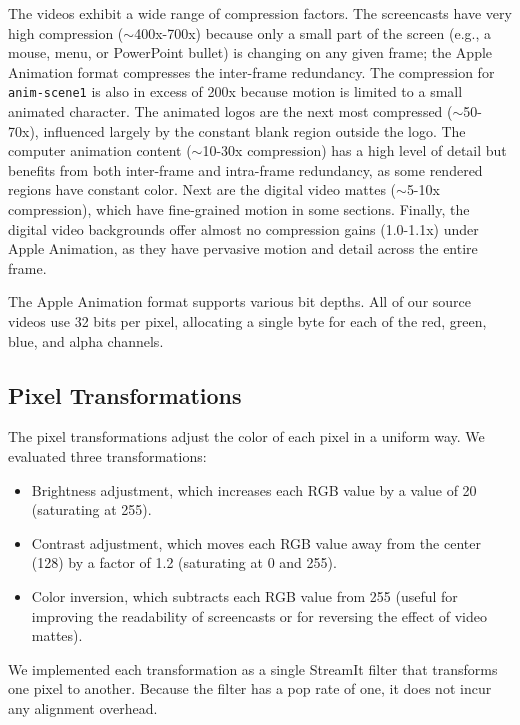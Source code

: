 The videos exhibit a wide range of compression factors.  The
screencasts have very high compression ($\sim$400x-700x) because only
a small part of the screen (e.g., a mouse, menu, or PowerPoint bullet)
is changing on any given frame; the Apple Animation format compresses
the inter-frame redundancy.  The compression for {\tt anim-scene1} is
also in excess of 200x because motion is limited to a small animated
character.  The animated logos are the next most compressed
($\sim$50-70x), influenced largely by the constant blank region
outside the logo.  The computer animation content ($\sim$10-30x
compression) has a high level of detail but benefits from both
inter-frame and intra-frame redundancy, as some rendered regions have
constant color.  Next are the digital video mattes ($\sim$5-10x
compression), which have fine-grained motion in some sections.
Finally, the digital video backgrounds offer almost no compression
gains (1.0-1.1x) under Apple Animation, as they have pervasive motion
and detail across the entire frame.

The Apple Animation format supports various bit depths.  All of our
source videos use 32 bits per pixel, allocating a single byte for each
of the red, green, blue, and alpha channels.

\subsection{Pixel Transformations}

The pixel transformations adjust the color of each pixel in a uniform
way.  We evaluated three transformations:
\begin{itemize}
\item Brightness adjustment, which increases each RGB value by a value
of 20 (saturating at 255).
\item Contrast adjustment, which moves each RGB value away from the
center (128) by a factor of 1.2 (saturating at 0 and 255).

\item Color inversion, which subtracts each RGB value from 255 (useful
  for improving the readability of screencasts or for reversing the
  effect of video mattes).

\end{itemize}

We implemented each transformation as a single StreamIt filter that
transforms one pixel to another.  Because the filter has a pop rate of
one, it does not incur any alignment overhead.

